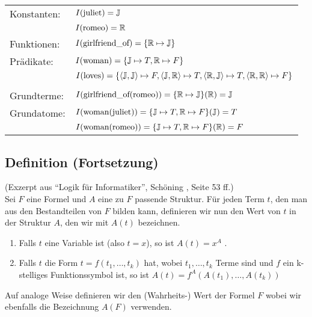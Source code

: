 \documentclass[a4paper,twoside,DIV15,BCOR12mm]{scrbook}
\begin{document}
\begin{tabular}{@{}ll}
Konstanten: & $I(\text{juliet}) = \mathbb{J}$                            \\
            & $I(\text{romeo}) = \mathbb{R}$                             \\
Funktionen: & $I(\text{girlfriend\_of}) = \{\mathbb{R} \mapsto \mathbb{J}\}$       \\
Prädikate:  & $I(\text{woman}) = \{ \mathbb{J} \mapsto T, \mathbb{R} \mapsto F\}$ \\
            & $I(\text{loves}) = \{\langle\mathbb{J}, \mathbb{J}\rangle \mapsto F, \langle\mathbb{J},\mathbb{R}\rangle \mapsto T, \langle\mathbb{R},\mathbb{J}\rangle \mapsto T, \langle\mathbb{R},\mathbb{R}\rangle \mapsto F \}$ \\\\
Grundterme:&
$I(\text{girlfriend\_of}(\text{romeo})) = \{\mathbb{R} \mapsto \mathbb{J}\} (\mathbb{R})=\mathbb{J}$
\\
Grundatome:&
$I(\text{woman}(\text{juliet})) = \{\mathbb{J} \mapsto T, \mathbb{R} \mapsto F\} (\mathbb{J}) = T$\\
&$I(\text{woman}(\text{romeo})) = \{\mathbb{J} \mapsto T, \mathbb{R} \mapsto F\} (\mathbb{R}) = F$
\end{tabular}%

\subsection{Definition (Fortsetzung)}
(Exzerpt aus "`Logik für Informatiker"', Schöning , Seite 53 ff.)\\
Sei $F$ eine Formel und $A$ eine zu $F$ passende Struktur. Für jeden Term $t$, den man aus den Bestandteilen von $F$ bilden kann, definieren wir nun den Wert von $t$ in der Struktur $A$, den wir mit $A(t)$ bezeichnen.

\begin{enumerate}
\item Falls $t$ eine Variable ist (also $t=x$), so ist $A(t)=x^A$ .
\item Falls $t$ die Form $t=f(t_1, \ldots, t_k)$ hat, wobei $t_1, \ldots, t_k$ Terme sind und $f$ ein k-stelliges Funktionssymbol ist, so ist $A(t)=f^A(A(t_1), \ldots, A(t_k))$
\end{enumerate}

Auf analoge Weise definieren wir den (Wahrheits-) Wert der Formel $F$ wobei wir ebenfalls die Bezeichnung $A(F)$ verwenden.
\end{document}
